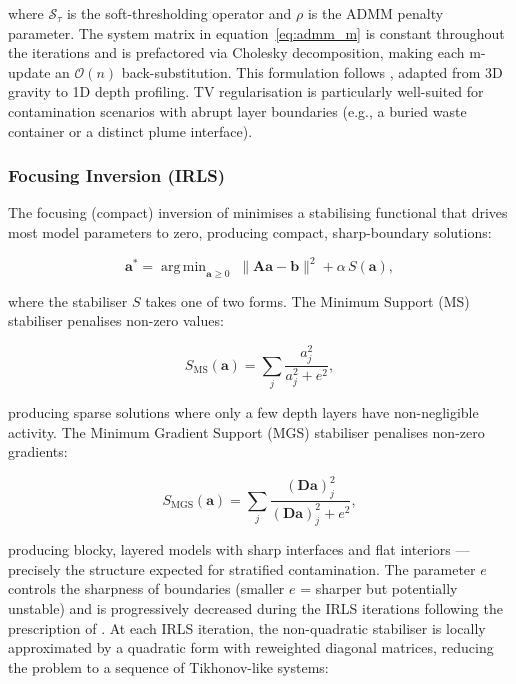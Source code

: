 \documentclass[a4paper,11pt]{article}
\DeclareMathOperator*{\argmin}{arg\,min}
\begin{document}
where $\mathcal{S}_\tau$ is the soft-thresholding operator and $\rho$ is
the ADMM penalty parameter.  The system matrix in
equation~\eqref{eq:admm_m} is constant throughout the iterations and is
prefactored via Cholesky decomposition, making each m-update an
$\mathcal{O}(n)$ back-substitution.  This formulation follows
\citet{vatankhah2018tv}, adapted from 3D gravity to 1D depth profiling.
TV regularisation is particularly well-suited for contamination
scenarios with abrupt layer boundaries (e.g., a buried waste container
or a distinct plume interface).

\subsubsection{Focusing Inversion (IRLS)}

The focusing (compact) inversion of \citet{portniaguine1999focusing}
minimises a stabilising functional that drives most model parameters to
zero, producing compact, sharp-boundary solutions:

\begin{equation}
  \bm{a}^* = \argmin_{\bm{a} \geq 0}\; \|\bm{A}\bm{a} - \bm{b}\|^2 + \alpha\, S(\bm{a}),
\end{equation}

where the stabiliser $S$ takes one of two forms.  The Minimum Support (MS)
stabiliser penalises non-zero values:

\begin{equation}
  S_{\mathrm{MS}}(\bm{a}) = \sum_j \frac{a_j^2}{a_j^2 + e^2},
\end{equation}

producing sparse solutions where only a few depth layers have
non-negligible activity.  The Minimum Gradient Support (MGS) stabiliser
penalises non-zero gradients:

\begin{equation}
  S_{\mathrm{MGS}}(\bm{a}) = \sum_j \frac{(\bm{D}\bm{a})_j^2}{(\bm{D}\bm{a})_j^2 + e^2},
\end{equation}

producing blocky, layered models with sharp interfaces and flat
interiors --- precisely the structure expected for stratified
contamination.  The parameter $e$ controls the sharpness of boundaries
(smaller $e$ = sharper but potentially unstable) and is progressively
decreased during the IRLS iterations following the prescription of
\citet{zhdanov2002geophysical}.  At each IRLS iteration, the
non-quadratic stabiliser is locally approximated by a quadratic form
with reweighted diagonal matrices, reducing the problem to a sequence
of Tikhonov-like systems:
\end{document}
